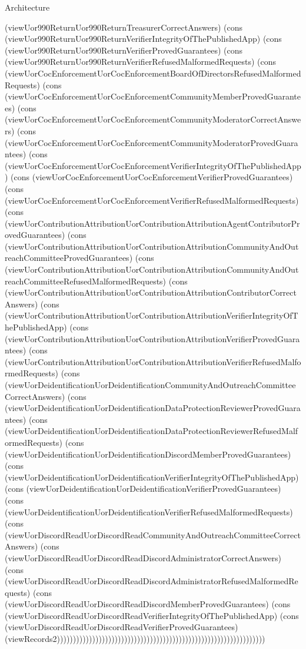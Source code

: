 \begin{lexlean}{Architecture}
\begin{semanticmodule}
{(viewUor990ReturnUor990ReturnTreasurerCorrectAnswers) (cons (viewUor990ReturnUor990ReturnVerifierIntegrityOfThePublishedApp) (cons (viewUor990ReturnUor990ReturnVerifierProvedGuarantees) (cons (viewUor990ReturnUor990ReturnVerifierRefusedMalformedRequests) (cons (viewUorCocEnforcementUorCocEnforcementBoardOfDirectorsRefusedMalformedRequests) (cons (viewUorCocEnforcementUorCocEnforcementCommunityMemberProvedGuarantees) (cons (viewUorCocEnforcementUorCocEnforcementCommunityModeratorCorrectAnswers) (cons (viewUorCocEnforcementUorCocEnforcementCommunityModeratorProvedGuarantees) (cons (viewUorCocEnforcementUorCocEnforcementVerifierIntegrityOfThePublishedApp) (cons (viewUorCocEnforcementUorCocEnforcementVerifierProvedGuarantees) (cons (viewUorCocEnforcementUorCocEnforcementVerifierRefusedMalformedRequests) (cons (viewUorContributionAttributionUorContributionAttributionAgentContributorProvedGuarantees) (cons (viewUorContributionAttributionUorContributionAttributionCommunityAndOutreachCommitteeProvedGuarantees) (cons (viewUorContributionAttributionUorContributionAttributionCommunityAndOutreachCommitteeRefusedMalformedRequests) (cons (viewUorContributionAttributionUorContributionAttributionContributorCorrectAnswers) (cons (viewUorContributionAttributionUorContributionAttributionVerifierIntegrityOfThePublishedApp) (cons (viewUorContributionAttributionUorContributionAttributionVerifierProvedGuarantees) (cons (viewUorContributionAttributionUorContributionAttributionVerifierRefusedMalformedRequests) (cons (viewUorDeidentificationUorDeidentificationCommunityAndOutreachCommitteeCorrectAnswers) (cons (viewUorDeidentificationUorDeidentificationDataProtectionReviewerProvedGuarantees) (cons (viewUorDeidentificationUorDeidentificationDataProtectionReviewerRefusedMalformedRequests) (cons (viewUorDeidentificationUorDeidentificationDiscordMemberProvedGuarantees) (cons (viewUorDeidentificationUorDeidentificationVerifierIntegrityOfThePublishedApp) (cons (viewUorDeidentificationUorDeidentificationVerifierProvedGuarantees) (cons (viewUorDeidentificationUorDeidentificationVerifierRefusedMalformedRequests) (cons (viewUorDiscordReadUorDiscordReadCommunityAndOutreachCommitteeCorrectAnswers) (cons (viewUorDiscordReadUorDiscordReadDiscordAdministratorCorrectAnswers) (cons (viewUorDiscordReadUorDiscordReadDiscordAdministratorRefusedMalformedRequests) (cons (viewUorDiscordReadUorDiscordReadDiscordMemberProvedGuarantees) (cons (viewUorDiscordReadUorDiscordReadVerifierIntegrityOfThePublishedApp) (cons (viewUorDiscordReadUorDiscordReadVerifierProvedGuarantees) (viewRecords2)))))))))))))))))))))))))))))))))))))))))))))))))))))))))))))))))
}


\end{semanticmodule}
\end{lexlean}
